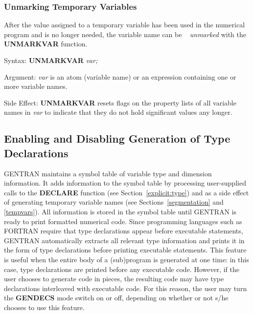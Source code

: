 \subsubsection{Unmarking Temporary Variables}
 
After the value assigned to a temporary variable has been used
in the numerical program and is no longer needed, the variable name can be \
{\it unmarked} with the {\bf UNMARKVAR} function.
\begin{describe}{Syntax:}
{\bf UNMARKVAR} {\it  var;}
\end{describe}
\begin{describe}{Argument:}
{\it var} is an atom (variable name) or an expression containing one or more
variable names.
\end{describe}
\begin{describe}{Side Effect:}
{\bf UNMARKVAR} resets flags on the property lists of all variable names in
{\it var} to indicate that they do not hold significant values any longer.
\end{describe}

\subsection{Enabling and Disabling Generation of Type Declarations}
\label{control:type}
GENTRAN maintains a symbol table of variable type and dimension
information.  It adds information to the symbol table by processing
user-supplied calls to the {\bf DECLARE} function (see
Section~\ref{explicit:type}) and as a
side effect of generating temporary variable names
(see Sections~\ref{segmentation} and \ref{tempvars}).
All information is stored in the symbol table until GENTRAN is ready
to print formatted numerical code.  Since programming languages such as
FORTRAN require that type declarations appear before executable statements,
GENTRAN automatically extracts all relevant type information and prints it
in the form of type declarations before printing executable
statements.  This feature is useful when the entire body of a (sub)program is
generated at one time:  in this case, type declarations are printed
before any executable code.  However, if the user chooses to generate code
in pieces, the resulting code may have type declarations interleaved
\index{GENDECS switch}
with executable code.  For this reason, the user may turn the {\bf GENDECS}
mode switch on or off, depending on whether or not s/he chooses to use
this feature.

